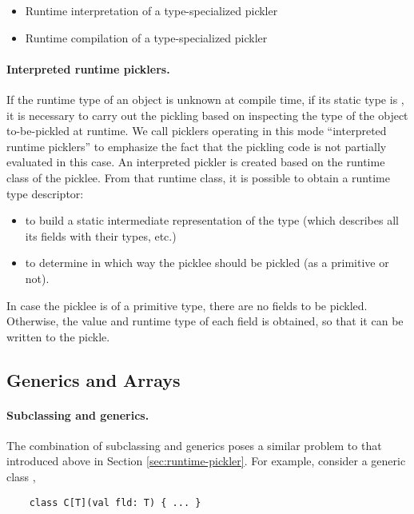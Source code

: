\begin{itemize}
\item Runtime interpretation of a type-specialized pickler
\item Runtime compilation of a type-specialized pickler
\end{itemize}

\paragraph{Interpreted runtime picklers.} If the runtime type of an object is
unknown at compile time, \eg if its static type is , it is
necessary to carry out the pickling based on inspecting the type of the object
to-be-pickled at runtime. We call picklers operating in this mode ``interpreted
runtime picklers'' to emphasize the fact that the pickling code is not
partially evaluated in this case. An interpreted pickler is created based on
the runtime class of the picklee. From that runtime class, it is possible to
obtain a runtime type descriptor:

\begin{itemize}
\item to build a static intermediate representation of the type (which describes all its fields with their types, etc.)
\item to determine in which way the picklee should be pickled (as a primitive or not).
\end{itemize}

In case the picklee is of a primitive type, there are no fields to be pickled.
Otherwise, the value and runtime type of each field is obtained, so that it
can be written to the pickle.


\subsection{Generics and Arrays}

\paragraph{Subclassing and generics.} The combination of subclassing and generics
poses a similar problem to that introduced above in Section \ref{sec:runtime-pickler}.
For example, consider a generic class ,

\begin{lstlisting}
    class C[T](val fld: T) { ... }
\end{lstlisting}

